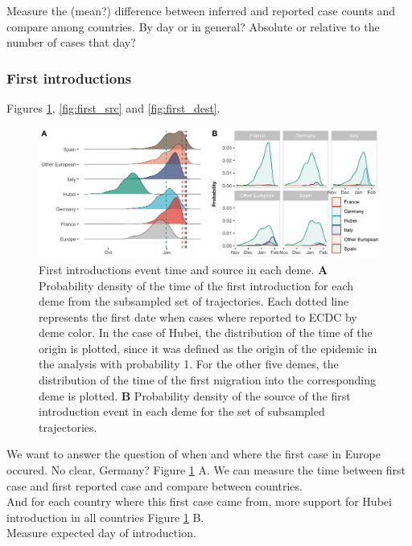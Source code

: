 \documentclass[12pt,]{article}
\begin{document}
Measure the (mean?) difference between inferred and reported case counts and compare among countries. By day or in general? Absolute or relative to the number of cases that day?


\subsubsection*{First introductions}
Figures \ref{fig:first}, \ref{fig:first_src} and \ref{fig:first_dest}.\\


\begin{figure}[ht]
    \centering
    \includegraphics[width=\textwidth]{201014_europe2_figtraj03.png}
    \caption{First introductions event time and source in each deme. \textbf{A} Probability density of the time of the first introduction for each deme from the subsampled set of trajectories. Each dotted line represents the first date when cases where reported to ECDC by deme color. In the case of Hubei, the distribution of the time of the origin is plotted, since it was defined as the origin of the epidemic in the analysis with probability 1. For the other five demes, the distribution of the time of the first migration into the corresponding deme is plotted. \textbf{B} Probability density of the source of the first introduction event in each deme for the set of subsampled trajectories.}
    \label{fig:first}
\end{figure}

We want to answer the question of when and where the first case in Europe occured. No clear, Germany? Figure \ref{fig:first} A. We can measure the time between first case and first reported case and compare between countries. \\
And for each country where this first case came from, more support for Hubei introduction in all countries Figure \ref{fig:first} B.\\

Measure expected day of introduction.
\end{document}
